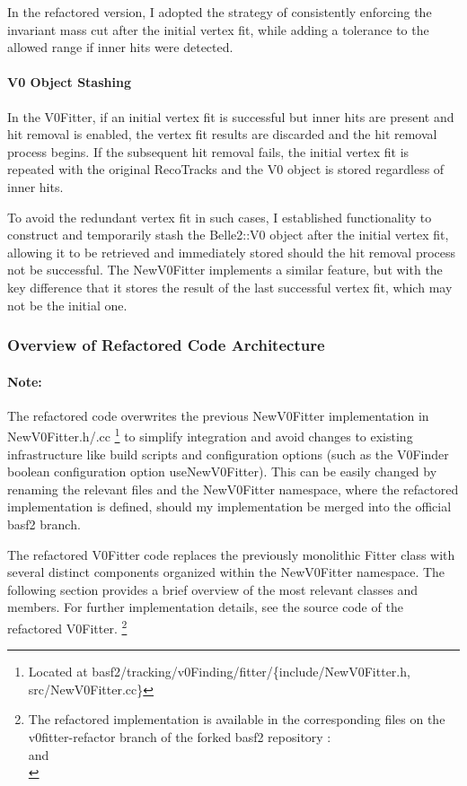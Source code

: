 In the refactored version, I adopted the strategy of consistently enforcing the invariant mass cut after the initial vertex fit, while adding a tolerance to the allowed range if inner hits were detected.

\paragraph{V0 Object Stashing}
In the V0Fitter, if an initial vertex fit is successful but inner hits are present and hit removal is enabled, the vertex fit results are discarded and the hit removal process begins.
If the subsequent hit removal fails, the initial vertex fit is repeated with the original RecoTracks and the V0 object is stored regardless of inner hits.

To avoid the redundant vertex fit in such cases, I established functionality to construct and temporarily stash the Belle2::V0 object after the initial vertex fit, allowing it to be retrieved and immediately stored should the hit removal process not be successful.
The NewV0Fitter implements a similar feature, but with the key difference that it stores the result of the last successful vertex fit, which may not be the initial one.


\subsubsection{Overview of Refactored Code Architecture}
\paragraph{Note:} The refactored code overwrites the previous NewV0Fitter implementation in NewV0Fitter.h/.cc \footnote{%
  Located at basf2/tracking/v0Finding/fitter/\{include/NewV0Fitter.h, src/NewV0Fitter.cc\}
}
to simplify integration and avoid changes to existing infrastructure like build scripts and configuration options (such as the V0Finder boolean configuration option useNewV0Fitter). This can be easily changed by renaming the relevant files and the NewV0Fitter namespace, where the refactored implementation is defined, should my implementation be merged into the official basf2 branch.

\vspace{\baselineskip}
The refactored V0Fitter code replaces the previously monolithic Fitter class with several distinct components organized within the NewV0Fitter namespace. The following section provides a brief overview of the most relevant classes and members. For further implementation details, see the source code of the refactored V0Fitter.%
\footnote{%
  The refactored implementation is available in the corresponding files on the v0fitter-refactor branch of the forked basf2 repository
  :\\
   and\\
}

